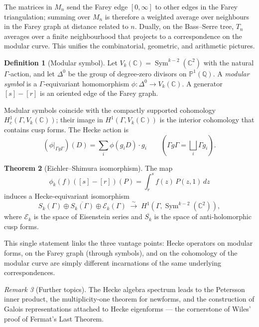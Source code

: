 \documentclass[10pt, a4paper]{article}
\newcommand{\C}{\mathbb{C}}
\newcommand{\Q}{\mathbb{Q}}
\theoremstyle{definition}
\newtheorem{theorem}{Theorem}[section]
\newtheorem{definition}[theorem]{Definition}
\theoremstyle{remark}
\newtheorem{remark}[theorem]{Remark}
\begin{document}
The matrices in $M_n$ send the Farey edge $[0,\infty]$ to other edges in the Farey triangulation; summing over $M_n$ is therefore a weighted average over neighbours in the Farey graph at distance related to $n$. Dually, on the Bass–Serre tree, $T_n$ averages over a finite neighbourhood that projects to a correspondence on the modular curve. This unifies the combinatorial, geometric, and arithmetic pictures.

\begin{definition}[Modular symbol]
Let $V_k(\C) = \operatorname{Sym}^{k-2}(\C^2)$ with the natural $\Gamma$‑action, and let $\Delta^0$ be the group of degree‑zero divisors on $\mathbb P^1(\Q)$. A \emph{modular symbol} is a $\Gamma$‑equivariant homomorphism $\phi : \Delta^0 \to V_k(\C)$. A generator $[s]-[r]$ is an oriented edge of the Farey graph.
\end{definition}

Modular symbols coincide with the compactly supported cohomology $H^1_c(\Gamma, V_k(\C))$; their image in $H^1(\Gamma, V_k(\C))$ is the interior cohomology that contains cusp forms. The Hecke action is
\[
(\phi|_{\Gamma g\Gamma})(D) = \sum_i \phi(g_i D)\cdot g_i \qquad (\Gamma g\Gamma = \bigsqcup_i \Gamma g_i).
\]

\begin{theorem}[Eichler–Shimura isomorphism]
The map
\[
\phi_k(f)([s]-[r])(P) = \int_r^s f(z)\, P(z,1)\, dz
\]
induces a Hecke‑equivariant isomorphism
\[
S_k(\Gamma) \oplus \overline{S_k(\Gamma)} \oplus \mathcal{E}_k(\Gamma) \;\stackrel{\sim}{\longrightarrow}\; H^1(\Gamma, \operatorname{Sym}^{k-2}(\C^2)),
\]
where $\mathcal{E}_k$ is the space of Eisenstein series and $\overline{S_k}$ is the space of anti‑holomorphic cusp forms.
\end{theorem}

This single statement links the three vantage points: Hecke operators on modular forms, on the Farey graph (through symbols), and on the cohomology of the modular curve are simply different incarnations of the same underlying correspondences.

\begin{remark}[Further topics]
The Hecke algebra spectrum leads to the Petersson inner product, the multiplicity‑one theorem for newforms, and the construction of Galois representations attached to Hecke eigenforms — the cornerstone of Wiles’ proof of Fermat’s Last Theorem.
\end{remark}


       
\end{document}
